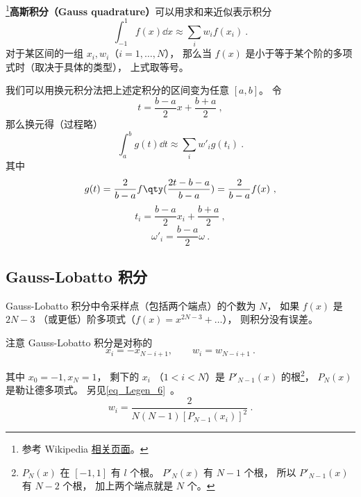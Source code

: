 
\begin{issues}
\issueAbstract
\end{issues}


\footnote{参考 Wikipedia \href{https://en.wikipedia.org/wiki/Gaussian_quadrature}{相关页面}。}\textbf{高斯积分（Gauss quadrature）}可以用求和来近似表示积分
\begin{equation}
\int_{-1}^1 f(x) \dd{x} \approx \sum_i w_i f(x_i)~.
\end{equation}
对于某区间的一组 $x_i, w_i$（$i = 1,\dots,N$）， 那么当 $f(x)$ 是小于等于某个阶的多项式时（取决于具体的类型）， 上式取等号。

我们可以用换元积分法把上述定积分的区间变为任意 $[a,b]$。 令
\begin{equation}
t = \frac{b-a}{2}x + \frac{b+a}{2}~,
\end{equation}
那么换元得（过程略）
\begin{equation}
\int_a^b g(t) \dd{t} \approx \sum_i w'_i g(t_i)~.
\end{equation}
其中
\begin{equation}
g(t) = \frac{2}{b-a} f\qty(\frac{2t - b - a}{b - a}) = \frac{2}{b-a} f(x)~,
\end{equation}
\begin{equation}
t_i = \frac{b-a}{2}x_i + \frac{b+a}{2}~,
\end{equation}
\begin{equation}
\omega'_i = \frac{b-a}{2}\omega~.
\end{equation}


\subsection{Gauss-Lobatto 积分}
Gauss-Lobatto 积分中令采样点（包括两个端点）的个数为 $N$， 如果 $f(x)$ 是 $2N-3$ （或更低）阶多项式（$f(x) = x^{2N-3} + \dots$）， 则积分没有误差。

注意 Gauss-Lobatto 积分是对称的
\begin{equation}\label{eq_GLquad_5}
x_i = -x_{N-i+1}, \qquad w_{i} = w_{N-i+1}~.
\end{equation}

其中 $x_0 = -1, x_N = 1$， 剩下的 $x_i$ （$1 < i < N$）是 $P'_{N-1}(x)$ 的根\footnote{$P_N(x)$ 在 $[-1,1]$ 有 $l$ 个根。 $P'_N(x)$ 有 $N-1$ 个根， 所以 $P'_{N-1}(x)$ 有 $N-2$ 个根， 加上两个端点就是 $N$ 个。}， $P_N(x)$ 是勒让德多项式。 另见\autoref{eq_Legen_6}~。
\begin{equation} %
w_i = \frac{2}{N(N-1)[P_{N-1}(x_i)]^2}~.
\end{equation}

